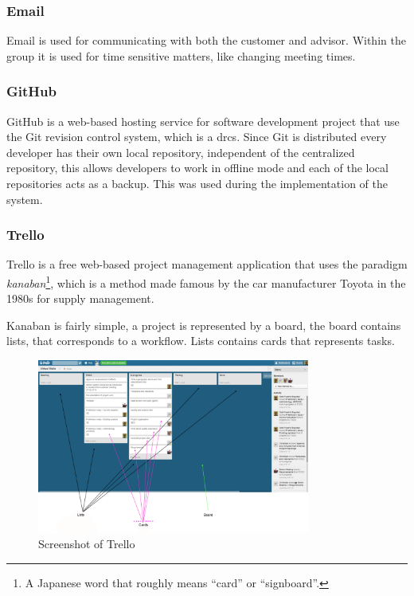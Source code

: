 \documentclass[11pt]{book}
\begin{document}
\subsubsection{Email}
Email is used for communicating with both the customer and advisor. Within the group it is used for time sensitive matters, like changing meeting times.

\subsubsection{GitHub}
GitHub\cite{github} is a web-based hosting service for software development project that use the Git revision control system, which is a \gls{drcs}. Since Git is distributed every developer has their own local repository, independent of the centralized repository, this allows developers to work in offline mode and each of the local repositories acts as a backup. This was used during the implementation of the system.

\subsubsection{Trello}
Trello\cite{trello} is a free web-based project management application that uses the paradigm \emph{kanaban}\footnote{A Japanese word that roughly means ``card'' or ``signboard''.}, which is a method made famous by the car manufacturer Toyota in the 1980s for supply management. 

Kanaban is fairly simple, a project is represented by a board, the board contains lists, that corresponds to a workflow. Lists contains cards that represents tasks.

\begin{figure}[H]
      \centering
      \includegraphics[width=0.8\textwidth]{Figures/trello.png}
      \caption{Screenshot of Trello}
      \label{fig:tools_trello}
\end{figure}
\end{document}
